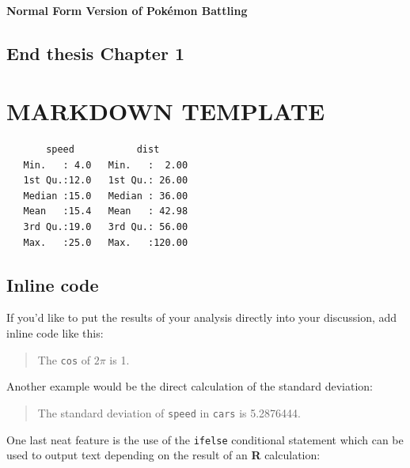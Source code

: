 \documentclass[12pt,twoside]{reedthesis}
\begin{document}
  \subsubsection{Normal Form Version of Pokémon
  Battling}\label{normal-form-version-of-pokemon-battling}
  
  \section{End thesis Chapter 1}\label{end-thesis-chapter-1}
  
  \chapter{MARKDOWN TEMPLATE}\label{markdown-template}
  
  \begin{Shaded}
  \begin{Highlighting}[]
  \end{Highlighting}
  \end{Shaded}
  
  \begin{verbatim}
       speed           dist       
   Min.   : 4.0   Min.   :  2.00  
   1st Qu.:12.0   1st Qu.: 26.00  
   Median :15.0   Median : 36.00  
   Mean   :15.4   Mean   : 42.98  
   3rd Qu.:19.0   3rd Qu.: 56.00  
   Max.   :25.0   Max.   :120.00  
  \end{verbatim}
  
  \section{Inline code}\label{inline-code}
  
  If you'd like to put the results of your analysis directly into your
  discussion, add inline code like this:
  
  \begin{quote}
  The \texttt{cos} of \(2 \pi\) is 1.
  \end{quote}
  
  Another example would be the direct calculation of the standard
  deviation:
  
  \begin{quote}
  The standard deviation of \texttt{speed} in \texttt{cars} is 5.2876444.
  \end{quote}
  
  One last neat feature is the use of the \texttt{ifelse} conditional
  statement which can be used to output text depending on the result of an
  \textbf{R} calculation:
  
\end{document}
